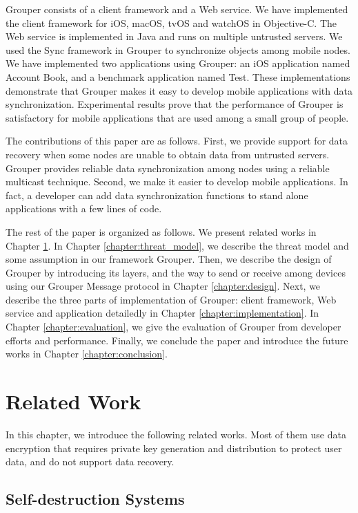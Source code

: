 \documentclass[a4paper,11pt]{report}
\begin{document}
Grouper consists of a client framework and a Web service.
We have implemented the client framework for iOS, macOS, tvOS and watchOS in Objective-C.
The Web service is implemented in Java and runs on multiple untrusted servers.
We used the Sync\cite{sync} framework in Grouper to synchronize objects among mobile nodes.
We have implemented two applications using Grouper: an iOS application named Account Book, and a benchmark application named Test.
These implementations demonstrate that Grouper makes it easy to develop mobile applications with data synchronization.
Experimental results prove that the performance of Grouper is satisfactory for mobile applications that are used among a small group of people.

The contributions of this paper are as follows.
First, we provide support for data recovery when some nodes are unable to obtain data from untrusted servers.
Grouper provides reliable data synchronization among nodes using a reliable multicast technique.
Second, we make it easier to develop mobile applications.
In fact, a developer can add data synchronization functions to stand alone applications with a few lines of code.

The rest of the paper is organized as follows.
We present related works in Chapter \ref{chapter:related_work}.
In Chapter \ref{chapter:threat_model}, we describe the threat model and some assumption in our framework Grouper.
Then, we describe the design of Grouper by introducing its layers, and the way to send or receive among devices using our Grouper Message protocol in Chapter \ref{chapter:design}.
Next, we describe the three parts of implementation of Grouper: client framework, Web service and application detailedly in Chapter \ref{chapter:implementation}.
In Chapter \ref{chapter:evaluation}, we give the evaluation of Grouper from developer efforts and performance.
Finally, we conclude the paper and introduce the future works in Chapter \ref{chapter:conclusion}.

\chapter{Related Work} \label{chapter:related_work}

In this chapter, we introduce the following related works. 
Most of them use data encryption that requires private key generation and distribution to protect user data, and do not support data recovery.

\section{Self-destruction Systems}
\end{document}
